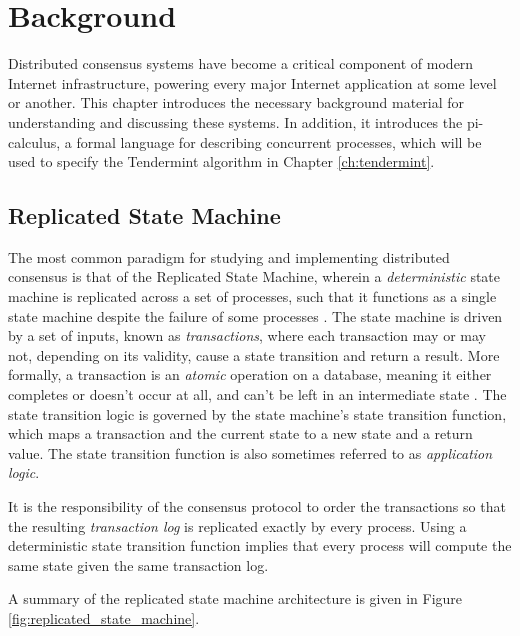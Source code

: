\chapter{Background}
\label{ch:background}

\renewcommand{\|}{\;|\;}

Distributed consensus systems have become a critical component of modern Internet infrastructure, 
powering every major Internet application at some level or another.
This chapter introduces the necessary background material for understanding and discussing these systems.
In addition, it introduces the pi-calculus, a formal language for describing concurrent processes,
which will be used to specify the Tendermint algorithm in Chapter \ref{ch:tendermint}.

\section{Replicated State Machine}

The most common paradigm for studying and implementing distributed consensus is that of the Replicated State Machine, 
wherein a \emph{deterministic} state machine is replicated across a set of processes, 
such that it functions as a single state machine 
despite the failure of some processes \cite{schneider1990implementing}.
The state machine is driven by a set of inputs, known as \emph{transactions}, 
where each transaction may or may not, depending on its validity, cause a state transition and return a result.
More formally, a transaction is an \emph{atomic} operation on a database, 
meaning it either completes or doesn't occur at all, 
and can't be left in an intermediate state \cite{gray1981transaction}.
The state transition logic is governed by the state machine's state transition function,
which maps a transaction and the current state to a new state and a return value.
The state transition function is also sometimes referred to as \emph{application logic}.

It is the responsibility of the consensus protocol to order the transactions so that the resulting 
\emph{transaction log} is replicated exactly by every process.
Using a deterministic state transition function implies that 
every process will compute the same state given the same transaction log.

A summary of the replicated state machine architecture is given in Figure \ref{fig:replicated_state_machine}.

